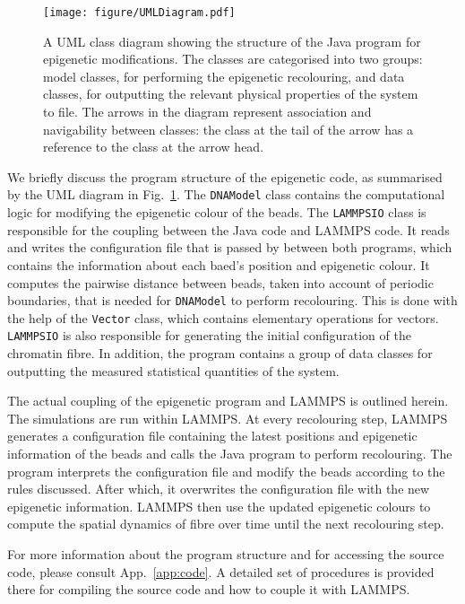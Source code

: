 \documentclass[12pt]{article}
\begin{document}
\begin{figure}[t]
\centering
\texttt{[image: figure/UMLDiagram.pdf]}
\caption{A UML class diagram showing the structure of the Java program for epigenetic modifications. The classes are categorised into two groups: model classes, for performing the epigenetic recolouring, and data classes, for outputting the relevant physical properties of the system to file. The arrows in the diagram represent association and navigability between classes: the class at the tail of the arrow has a reference to the class at the arrow head.}
\label{fig:uml}
\end{figure}

We briefly discuss the program structure of the epigenetic code, as summarised by the UML diagram in Fig.~\ref{fig:uml}. The \texttt{DNAModel} class contains the computational logic for modifying the epigenetic colour of the beads. The \texttt{LAMMPSIO} class is responsible for the coupling between the Java code and LAMMPS code. It reads and writes the configuration file that is passed by between both programs, which contains the information about each baed's position and epigenetic colour. It computes the pairwise distance between beads, taken into account of periodic boundaries, that is needed for \texttt{DNAModel} to perform recolouring. This is done with the help of the \texttt{Vector} class, which contains elementary operations for vectors. \texttt{LAMMPSIO} is also responsible for generating the initial configuration of the chromatin fibre. In addition, the program contains a group of data classes for outputting the measured statistical quantities of the system. 

The actual coupling of the epigenetic program and LAMMPS is outlined herein. The simulations are run within LAMMPS. At every recolouring step, LAMMPS generates a configuration file containing the latest positions and epigenetic information of the beads and calls the Java program to perform recolouring. The program interprets the configuration file and modify the beads according to the rules discussed. After which, it overwrites the configuration file with the new epigenetic information. LAMMPS then use the updated epigenetic colours to compute the spatial dynamics of fibre over time until the next recolouring step.

For more information about the program structure and for accessing the source code, please consult App.~\ref{app:code}. A detailed set of procedures is provided there for compiling the source code and how to couple it with LAMMPS.
\end{document}
